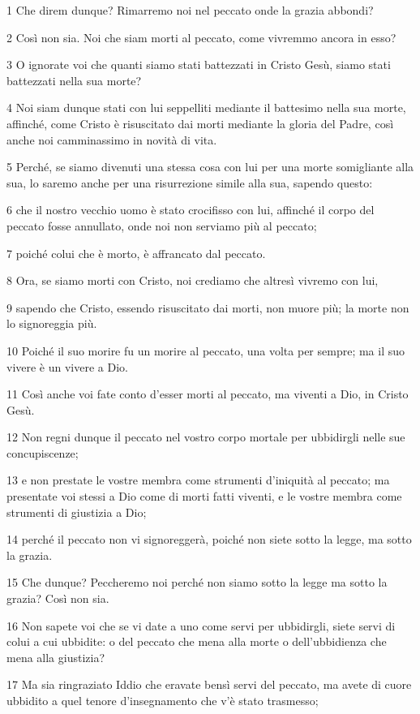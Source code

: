 \par 1 Che direm dunque? Rimarremo noi nel peccato onde la grazia abbondi?
\par 2 Così non sia. Noi che siam morti al peccato, come vivremmo ancora in esso?
\par 3 O ignorate voi che quanti siamo stati battezzati in Cristo Gesù, siamo stati battezzati nella sua morte?
\par 4 Noi siam dunque stati con lui seppelliti mediante il battesimo nella sua morte, affinché, come Cristo è risuscitato dai morti mediante la gloria del Padre, così anche noi camminassimo in novità di vita.
\par 5 Perché, se siamo divenuti una stessa cosa con lui per una morte somigliante alla sua, lo saremo anche per una risurrezione simile alla sua, sapendo questo:
\par 6 che il nostro vecchio uomo è stato crocifisso con lui, affinché il corpo del peccato fosse annullato, onde noi non serviamo più al peccato;
\par 7 poiché colui che è morto, è affrancato dal peccato.
\par 8 Ora, se siamo morti con Cristo, noi crediamo che altresì vivremo con lui,
\par 9 sapendo che Cristo, essendo risuscitato dai morti, non muore più; la morte non lo signoreggia più.
\par 10 Poiché il suo morire fu un morire al peccato, una volta per sempre; ma il suo vivere è un vivere a Dio.
\par 11 Così anche voi fate conto d'esser morti al peccato, ma viventi a Dio, in Cristo Gesù.
\par 12 Non regni dunque il peccato nel vostro corpo mortale per ubbidirgli nelle sue concupiscenze;
\par 13 e non prestate le vostre membra come strumenti d'iniquità al peccato; ma presentate voi stessi a Dio come di morti fatti viventi, e le vostre membra come strumenti di giustizia a Dio;
\par 14 perché il peccato non vi signoreggerà, poiché non siete sotto la legge, ma sotto la grazia.
\par 15 Che dunque? Peccheremo noi perché non siamo sotto la legge ma sotto la grazia? Così non sia.
\par 16 Non sapete voi che se vi date a uno come servi per ubbidirgli, siete servi di colui a cui ubbidite: o del peccato che mena alla morte o dell'ubbidienza che mena alla giustizia?
\par 17 Ma sia ringraziato Iddio che eravate bensì servi del peccato, ma avete di cuore ubbidito a quel tenore d'insegnamento che v'è stato trasmesso;
